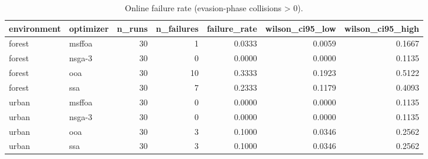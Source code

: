\begin{table}
\caption{Online failure rate (evasion-phase collisions > 0).}
\label{tab:failure-rate-online}
\begin{tabular}{llrrrrr}
\toprule
environment & optimizer & n\_runs & n\_failures & failure\_rate & wilson\_ci95\_low & wilson\_ci95\_high \\
\midrule
forest & msffoa & 30 & 1 & 0.0333 & 0.0059 & 0.1667 \\
forest & nsga-3 & 30 & 0 & 0.0000 & 0.0000 & 0.1135 \\
forest & ooa & 30 & 10 & 0.3333 & 0.1923 & 0.5122 \\
forest & ssa & 30 & 7 & 0.2333 & 0.1179 & 0.4093 \\
urban & msffoa & 30 & 0 & 0.0000 & 0.0000 & 0.1135 \\
urban & nsga-3 & 30 & 0 & 0.0000 & 0.0000 & 0.1135 \\
urban & ooa & 30 & 3 & 0.1000 & 0.0346 & 0.2562 \\
urban & ssa & 30 & 3 & 0.1000 & 0.0346 & 0.2562 \\
\bottomrule
\end{tabular}
\end{table}
